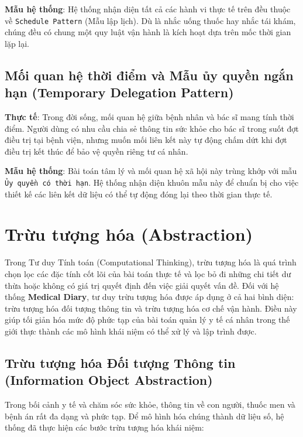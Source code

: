 \documentclass[12pt,a4paper]{report}
\begin{document}
\textbf{Mẫu hệ thống}: Hệ thống nhận diện tất cả các hành vi thực tế trên đều thuộc về \texttt{Schedule Pattern} (Mẫu lập lịch). Dù là nhắc uống thuốc hay nhắc tái khám, chúng đều có chung một quy luật vận hành là kích hoạt dựa trên mốc thời gian lặp lại.
\subsection{Mối quan hệ thời điểm và Mẫu ủy quyền ngắn hạn (Temporary Delegation Pattern)}
\textbf{Thực tế}: Trong đời sống, mối quan hệ giữa bệnh nhân và bác sĩ mang tính thời điểm. Người dùng có nhu cầu chia sẻ thông tin sức khỏe cho bác sĩ trong suốt đợt điều trị tại bệnh viện, nhưng muốn mối liên kết này tự động chấm dứt khi đợt điều trị kết thúc để bảo vệ quyền riêng tư cá nhân.

\textbf{Mẫu hệ thống}: Bài toán tâm lý và mối quan hệ xã hội này trùng khớp với mẫu \texttt{Ủy quyền có thời hạn}. Hệ thống nhận diện khuôn mẫu này để chuẩn bị cho việc thiết kế các liên kết dữ liệu có thể tự động đóng lại theo thời gian thực tế.

\section{Trừu tượng hóa (Abstraction)}

Trong Tư duy Tính toán (Computational Thinking), trừu tượng hóa là quá trình chọn lọc các đặc tính cốt lõi của bài toán thực tế và lọc bỏ đi những chi tiết dư thừa hoặc không có giá trị quyết định đến việc giải quyết vấn đề. Đối với hệ thống \textbf{Medical Diary}, tư duy trừu tượng hóa được áp dụng ở cả hai bình diện: trừu tượng hóa đối tượng thông tin và trừu tượng hóa cơ chế vận hành. Điều này giúp tối giản hóa mức độ phức tạp của bài toán quản lý y tế cá nhân trong thế giới thực thành các mô hình khái niệm có thể xử lý và lập trình được.

\subsection{Trừu tượng hóa Đối tượng Thông tin (Information Object Abstraction)}

Trong bối cảnh y tế và chăm sóc sức khỏe, thông tin về con người, thuốc men và bệnh án rất đa dạng và phức tạp. Để mô hình hóa chúng thành dữ liệu số, hệ thống đã thực hiện các bước trừu tượng hóa khái niệm:
\end{document}
